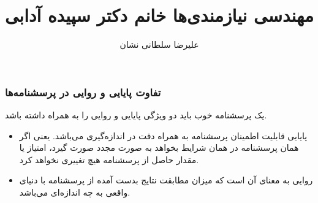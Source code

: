 \documentclass[a4paper]{article}
\title{مهندسی نیازمندی‌ها خانم دکتر سپیده آدابی}
\author{علیرضا سلطانی نشان}
\begin{document}
\maketitle
\subsubsection*{تفاوت پایایی و روایی در پرسشنامه‌ها}

یک پرسشنامه خوب باید دو ویژگی پایایی و روایی را به همراه داشته باشد. 

\begin{itemize}
    \item پایایی قابلیت اطمینان پرسشنامه به همراه دقت در اندازه‌گیری می‌باشد.
    یعنی اگر همان پرسشنامه در همان شرایط بخواهد به صورت مجدد صورت گیرد، امتیاز
    یا مقدار حاصل از پرسشنامه هیچ تغییری نخواهد کرد.
    \item روایی به معنای آن است که میزان مطابقت نتایج بدست آمده از پرسشنامه با
    دنیای واقعی به چه اندازه‌ای می‌باشد.
\end{itemize}
\end{document}
